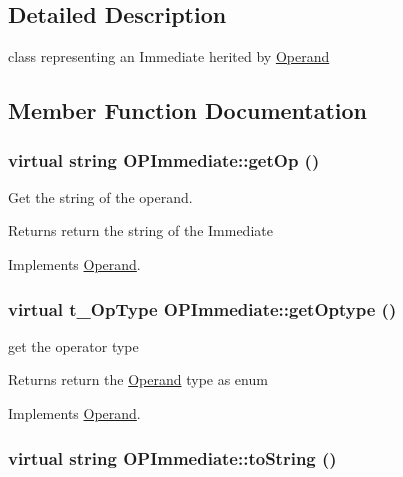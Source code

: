 \subsection{Detailed Description}
class representing an Immediate herited by \hyperlink{classOperand}{Operand} 

\subsection{Member Function Documentation}
\hypertarget{classOPImmediate_a36a14a13ac2dde34bba3d31cfd474f9b}{
\subsubsection[{getOp}]{\setlength{\rightskip}{0pt plus 5cm}virtual string OPImmediate::getOp ()}}
\label{classOPImmediate_a36a14a13ac2dde34bba3d31cfd474f9b}


Get the string of the operand. \begin{DoxyReturn}{Returns}
return the string of the Immediate 
\end{DoxyReturn}


Implements \hyperlink{classOperand_a8cf27955648cbf07144abf4e5a77c266}{Operand}.\hypertarget{classOPImmediate_af637aedc23b19948b3b2a3de80b730e7}{
\subsubsection[{getOptype}]{\setlength{\rightskip}{0pt plus 5cm}virtual t\_\-OpType OPImmediate::getOptype ()}}
\label{classOPImmediate_af637aedc23b19948b3b2a3de80b730e7}


get the operator type \begin{DoxyReturn}{Returns}
return the \hyperlink{classOperand}{Operand} type as enum 
\end{DoxyReturn}


Implements \hyperlink{classOperand_af4bd7dab87bfd7f3c17ea84f07b02b69}{Operand}.\hypertarget{classOPImmediate_adbf4bcd0bd6be9d6cb0dcbc5e09ff900}{
\subsubsection[{toString}]{\setlength{\rightskip}{0pt plus 5cm}virtual string OPImmediate::toString ()}}
\label{classOPImmediate_adbf4bcd0bd6be9d6cb0dcbc5e09ff900}


